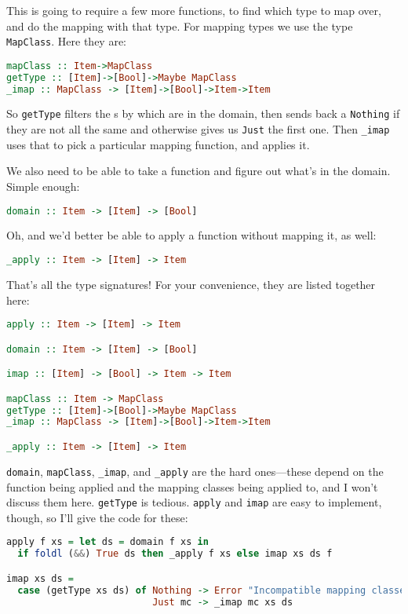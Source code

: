 \documentclass{article}
\newcommand{\code}[1]{\lstinline`#1`}
\begin{document}
This is going to require a few more functions, to find which type to map over, and do the mapping with that type. For mapping types we use the type \code{MapClass}. Here they are:
\begin{lstlisting}[language=Haskell]
mapClass :: Item->MapClass
getType :: [Item]->[Bool]->Maybe MapClass
_imap :: MapClass -> [Item]->[Bool]->Item->Item
\end{lstlisting}

So \code{getType} filters the \Item{}s by which are in the domain, then sends back a \code{Nothing} if they are not all the same and otherwise gives us \code{Just} the first one. Then \code{_imap} uses that to pick a particular mapping function, and applies it.

We also need to be able to take a function and figure out what's in the domain. Simple enough:
\begin{lstlisting}[language=Haskell]
domain :: Item -> [Item] -> [Bool]
\end{lstlisting}

Oh, and we'd better be able to apply a function without mapping it, as well:
\begin{lstlisting}[language=Haskell]
_apply :: Item -> [Item] -> Item
\end{lstlisting}

That's all the type signatures! For your convenience, they are listed together here:
\begin{lstlisting}[language=Haskell]
apply :: Item -> [Item] -> Item

domain :: Item -> [Item] -> [Bool]

imap :: [Item] -> [Bool] -> Item -> Item

mapClass :: Item -> MapClass
getType :: [Item]->[Bool]->Maybe MapClass
_imap :: MapClass -> [Item]->[Bool]->Item->Item

_apply :: Item -> [Item] -> Item
\end{lstlisting}

\code{domain}, \code{mapClass}, \code{_imap}, and \code{_apply} are the hard ones---these depend on the function being applied and the mapping classes being applied to, and I won't discuss them here. \code{getType} is tedious. \code{apply} and \code{imap} are easy to implement, though, so I'll give the code for these:
\begin{lstlisting}[language=Haskell]
apply f xs = let ds = domain f xs in
  if foldl (&&) True ds then _apply f xs else imap xs ds f

imap xs ds =
  case (getType xs ds) of Nothing -> Error "Incompatible mapping classes"
                          Just mc -> _imap mc xs ds
\end{lstlisting}
\end{document}
